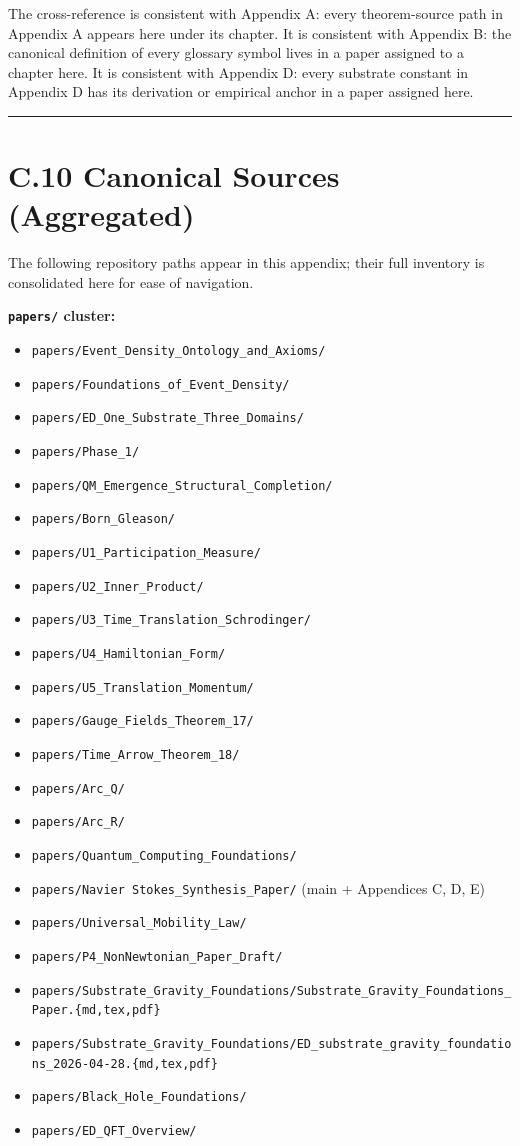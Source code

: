 \documentclass[11pt]{book}
\begin{document}
The cross-reference is consistent with Appendix A: every theorem-source path in Appendix A appears here under its chapter. It is consistent with Appendix B: the canonical definition of every glossary symbol lives in a paper assigned to a chapter here. It is consistent with Appendix D: every substrate constant in Appendix D has its derivation or empirical anchor in a paper assigned here.

\bigskip\hrule\bigskip

\section{C.10 Canonical Sources (Aggregated)}

The following repository paths appear in this appendix; their full inventory is consolidated here for ease of navigation.

\textbf{\texttt{papers/} cluster:}
\begin{itemize}
\item \texttt{papers/Event\_Density\_Ontology\_and\_Axioms/}
\item \texttt{papers/Foundations\_of\_Event\_Density/}
\item \texttt{papers/ED\_One\_Substrate\_Three\_Domains/}
\item \texttt{papers/Phase\_1/}
\item \texttt{papers/QM\_Emergence\_Structural\_Completion/}
\item \texttt{papers/Born\_Gleason/}
\item \texttt{papers/U1\_Participation\_Measure/}
\item \texttt{papers/U2\_Inner\_Product/}
\item \texttt{papers/U3\_Time\_Translation\_Schrodinger/}
\item \texttt{papers/U4\_Hamiltonian\_Form/}
\item \texttt{papers/U5\_Translation\_Momentum/}
\item \texttt{papers/Gauge\_Fields\_Theorem\_17/}
\item \texttt{papers/Time\_Arrow\_Theorem\_18/}
\item \texttt{papers/Arc\_Q/}
\item \texttt{papers/Arc\_R/}
\item \texttt{papers/Quantum\_Computing\_Foundations/}
\item \texttt{papers/Navier Stokes\_Synthesis\_Paper/} (main + Appendices C, D, E)
\item \texttt{papers/Universal\_Mobility\_Law/}
\item \texttt{papers/P4\_NonNewtonian\_Paper\_Draft/}
\item \texttt{papers/Substrate\_Gravity\_Foundations/Substrate\_Gravity\_Foundations\_Paper.\{md,tex,pdf\}}
\item \texttt{papers/Substrate\_Gravity\_Foundations/ED\_substrate\_gravity\_foundations\_2026-04-28.\{md,tex,pdf\}}
\item \texttt{papers/Black\_Hole\_Foundations/}
\item \texttt{papers/ED\_QFT\_Overview/}
\end{itemize}
\end{document}
